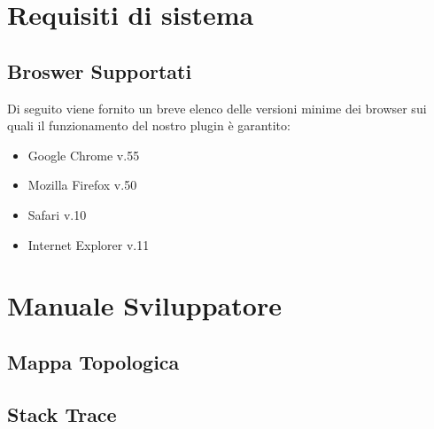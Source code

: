 \section{Requisiti di sistema}
\subsection{Broswer Supportati}

Di seguito viene fornito un breve elenco delle versioni minime dei browser sui quali il funzionamento del nostro plugin è garantito:
\begin{itemize}
	
	\item Google Chrome v.55
	\item Mozilla Firefox v.50
	\item Safari v.10
	\item Internet Explorer v.11
	
\end{itemize}




\section{Manuale Sviluppatore}
\subsection{Mappa Topologica}
\label{sec:mtopologica}

\subsection{Stack Trace}
\label{sec:strace}









